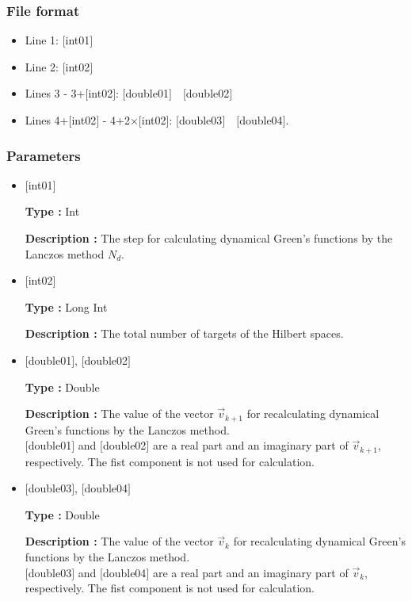 \subsubsection{File format}
 \begin{itemize}
   \item  Line 1: $[$int01$]$
   \item  Line 2: $[$int02$]$
   \item  Lines 3 - 3+$[$int02$]$: $[$double01$]$~~$[$double02$]$
   \item  Lines 4+$[$int02$]$ - 4+2$\times [$int02$]$: $[$double03$]$~~$[$double04$]$.

  \end{itemize}
\subsubsection{Parameters}
 \begin{itemize}

  \item  $[$int01$]$

 {\bf Type :} Int

 {\bf Description :} The step for calculating dynamical Green's functions by the Lanczos method $N_d$.

  \item  $[$int02$]$

 {\bf Type :} Long Int

{\bf Description :}  The total number of targets of the Hilbert spaces.

 
 \item  $[$double01$]$, $[$double02$]$

 {\bf Type :} Double 

{\bf Description :} The value of the vector $\vec{v}_{k+1}$ for recalculating dynamical Green's functions by the Lanczos method.\\
$[$double01$]$ and $[$double02$]$ are a real part and an imaginary part of $\vec{v}_{k+1}$, respectively. The fist component is not used for calculation.

\item  $[$double03$]$, $[$double04$]$

 {\bf Type :} Double 

{\bf Description :} The value of the vector $\vec{v}_{k}$ for recalculating dynamical Green's functions by the Lanczos method.\\
$[$double03$]$ and $[$double04$]$ are a real part and an imaginary part of $\vec{v}_{k}$, respectively. The fist component is not used for calculation.
\end{itemize}

